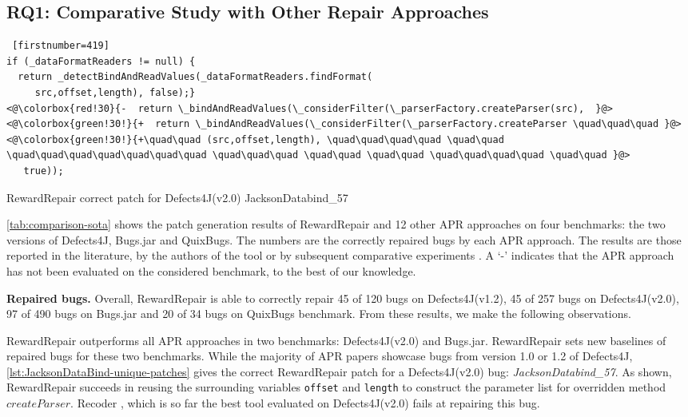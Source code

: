 \subsection{RQ1: Comparative Study with Other Repair Approaches}
\label{sec:result_comparison}

\begin{listing}[t!]
\noindent    \begin{lstlisting} [firstnumber=419] 
if (_dataFormatReaders != null) {
  return _detectBindAndReadValues(_dataFormatReaders.findFormat(
     src,offset,length), false);}
<@\colorbox{red!30}{-  return \_bindAndReadValues(\_considerFilter(\_parserFactory.createParser(src),  }@>        
<@\colorbox{green!30!}{+  return \_bindAndReadValues(\_considerFilter(\_parserFactory.createParser \quad\quad\quad }@>
<@\colorbox{green!30!}{+\quad\quad (src,offset,length), \quad\quad\quad\quad \quad\quad \quad\quad\quad\quad\quad\quad\quad \quad\quad\quad \quad\quad \quad\quad \quad\quad\quad\quad \quad\quad }@>
   true));
    \end{lstlisting}
 

\caption{RewardRepair correct patch for Defects4J(v2.0) JacksonDatabind\_57}
\label{lst:JacksonDataBind-unique-patches}
\end{listing}

\autoref{tab:comparison-sota} shows the patch generation results of RewardRepair and  12 other APR approaches on four benchmarks: the two versions of Defects4J, Bugs.jar and QuixBugs.
The numbers are the correctly repaired bugs by each APR approach.
The results are those reported in the literature, by the authors of the tool or by subsequent comparative experiments \cite{Liu2020Efficiency,quixbugs-jss}. A ‘-’ indicates that the APR approach has not been evaluated on the considered benchmark, to the best of our knowledge.

\textbf{Repaired bugs.} Overall,  RewardRepair is able to correctly repair 45 of 120 bugs on Defects4J(v1.2), 45 of 257 bugs on Defects4J(v2.0), 97 of 490 bugs on Bugs.jar and 20 of 34 bugs on QuixBugs benchmark. From these results, we make the following observations.

RewardRepair outperforms all APR approaches in two benchmarks: Defects4J(v2.0) and Bugs.jar.  
RewardRepair sets new baselines of repaired bugs for these two benchmarks. 
While the majority of APR papers showcase bugs from version 1.0 or 1.2 of Defects4J, \autoref{lst:JacksonDataBind-unique-patches} gives the correct RewardRepair patch for a Defects4J(v2.0) bug: \textit{JacksonDatabind\_57}. 
As shown, RewardRepair succeeds in reusing the surrounding variables \texttt{offset} and \texttt{length} to construct the parameter list for overridden method $createParser$. 
Recoder \cite{Recoder}, which is so far the best tool evaluated on Defects4J(v2.0) fails at repairing this bug.

